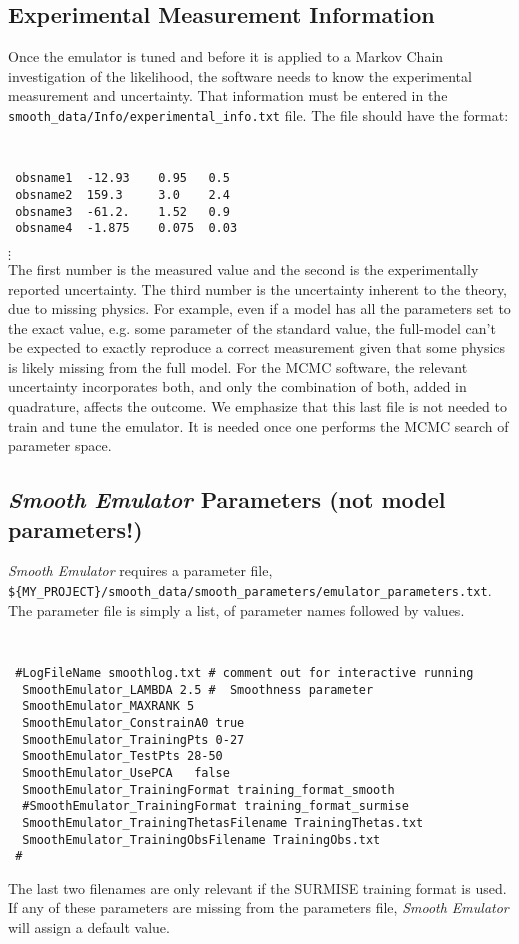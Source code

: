 \documentclass[UserManual.tex]{subfiles}
\begin{document}
\begin{enumerate}
\subsection{Experimental Measurement Information}
Once the emulator is tuned and before it is applied to a Markov Chain investigation of the likelihood, the software needs to know the experimental measurement and uncertainty. That information must be entered in the {\tt smooth\_data/Info/experimental\_info.txt} file. The file should have the format:
{\tt
\begin{verbatim}
 obsname1  -12.93    0.95   0.5
 obsname2  159.3     3.0    2.4
 obsname3  -61.2.    1.52   0.9
 obsname4  -1.875    0.075  0.03
\end{verbatim}}
\vspace*{-16pt}
 \hspace*{28pt}$\vdots$\\
The first number is the measured value and the second is the experimentally reported uncertainty. The third number is the uncertainty inherent to the theory, due to missing physics. For example, even if a model has all the parameters set to the exact value, e.g. some parameter of the standard value, the full-model can't be expected to exactly reproduce a correct measurement given that some physics is likely missing from the full model. For the MCMC software, the relevant uncertainty incorporates both, and only the combination of both, added in quadrature, affects the outcome. We emphasize that this last file is not needed to train and tune the emulator. It is needed once one performs the MCMC search of parameter space. 


\end{enumerate}

\subsection{{\it Smooth Emulator} Parameters (not model parameters!)}

{\it Smooth Emulator} requires a parameter file,\\
{\tt \$\{MY\_PROJECT\}/smooth\_data/smooth\_parameters/emulator\_parameters.txt}. The parameter file is simply a list, of parameter names followed by values. 

{\tt
\begin{verbatim}
 #LogFileName smoothlog.txt # comment out for interactive running
  SmoothEmulator_LAMBDA 2.5 #  Smoothness parameter
  SmoothEmulator_MAXRANK 5
  SmoothEmulator_ConstrainA0 true
  SmoothEmulator_TrainingPts 0-27
  SmoothEmulator_TestPts 28-50
  SmoothEmulator_UsePCA   false
  SmoothEmulator_TrainingFormat training_format_smooth
  #SmoothEmulator_TrainingFormat training_format_surmise
  SmoothEmulator_TrainingThetasFilename TrainingThetas.txt
  SmoothEmulator_TrainingObsFilename TrainingObs.txt
 #
\end{verbatim}
}
The last two filenames are only relevant if the SURMISE training format is used. If any of these parameters are missing from the parameters file, {\it Smooth Emulator} will assign a default value.
\end{document}
